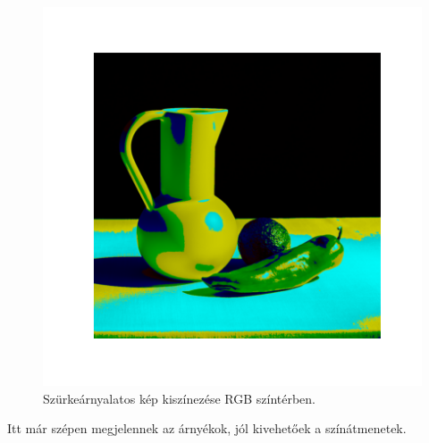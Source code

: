 \begin{figure}[h]
\centering
\includegraphics[scale=0.7]{images/colorized_rgb.png}
\caption{Szürkeárnyalatos kép kiszínezése RGB színtérben.}
\label{fig:colorized_rgb}
\end{figure}

Itt már szépen megjelennek az árnyékok, jól kivehetőek a színátmenetek. 

